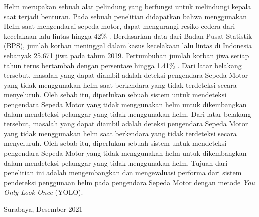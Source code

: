 Helm merupakan sebuah alat pelindung yang berfungsi untuk melindungi kepala saat
terjadi benturan. Pada sebuah penelitian didapatkan bahwa menggunakan Helm saat
mengendarai sepeda motor, dapat mengurangi resiko cedera dari kecelakaan lalu lintas
hingga 42\% \citep{helmetUse}. Berdasarkan data dari Badan Pusat Statistik (BPS), jumlah korban
meninggal dalam kasus kecelakaan lalu lintas di Indonesia sebanyak 25.671 jiwa pada
tahun 2019. Pertumbuhan jumlah korban jiwa setiap tahun terus bertambah dengan
persentase hingga 1.41\% \citep{transportasi2019}. Dari latar belakang tersebut, masalah yang dapat diambil
adalah deteksi pengendara Sepeda Motor yang tidak menggunakan helm saat berkendara
yang tidak terdeteksi secara menyeluruh. Oleh sebab itu, diperlukan sebuah sistem untuk
mendeteksi pengendara Sepeda Motor yang tidak menggunakan helm untuk dikembangkan
dalam mendeteksi pelanggar yang tidak menggunakan helm. Dari latar belakang tersebut,
masalah yang dapat diambil adalah deteksi pengendara Sepeda Motor yang tidak
menggunakan helm saat berkendara yang tidak terdeteksi secara menyeluruh. Oleh sebab
itu, diperlukan sebuah sistem untuk mendeteksi pengendara Sepeda Motor yang tidak
menggunakan helm untuk dikembangkan dalam mendeteksi pelanggar yang tidak
menggunakan helm. Tujuan dari penelitian ini adalah mengembangkan dan mengevaluasi performa dari sistem pendeteksi
penggunaan helm pada pengendara Sepeda Motor dengan metode \emph{You Only Look Once} (YOLO).
\vspace{1ex}

\begin{flushright}
  Surabaya, Desember 2021
\end{flushright}
\vspace{1ex}


